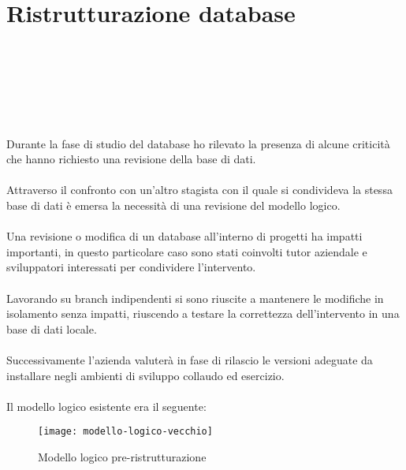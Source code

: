 
\chapter{Ristrutturazione database}
\label{cap:ristrutturazione-database}

\\\\\\\\\\\\
Durante la fase di studio del database ho rilevato la presenza di
alcune criticità che hanno richiesto una revisione della base di dati.
\\\\
Attraverso il confronto con un'altro stagista con il quale si condivideva la stessa base di dati 
è emersa la necessità di una revisione del modello logico.
\\\\
Una revisione o modifica di un database all'interno di progetti ha impatti importanti, in questo
particolare caso sono stati coinvolti tutor aziendale e sviluppatori interessati per condividere
l'intervento. 
\\\\
Lavorando su branch indipendenti si sono riuscite a mantenere le modifiche 
in isolamento senza impatti, riuscendo a testare la correttezza dell'intervento in una base di dati locale.
\\\\
Successivamente l'azienda valuterà in fase di rilascio le versioni adeguate da installare
negli ambienti di sviluppo collaudo ed esercizio.
\\\\
\clearpage
Il modello logico esistente era il seguente:
\begin{figure}[H]
  \centering
  \texttt{[image: modello-logico-vecchio]}
  \caption{Modello logico pre-ristrutturazione}
\end{figure}

